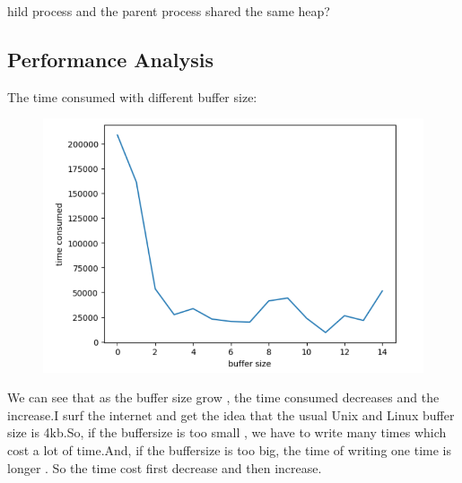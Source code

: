 \documentclass[]{article}
\begin{document}
\begin{enumerate}
                                                                                                                                                                                                                                                                                                                                                                                                                                                                                                                                                                                                                                                                                                                                                              hild process and the parent process shared the same heap?\par 
\end{enumerate}

\subsection*{Performance Analysis}
The time consumed with different buffer size:
\begin{figure}[H]
    \includegraphics[scale = 0.5]{2023-03-24-19-20-55.png}
\end{figure}
We can see that as the buffer size grow , the time consumed decreases and the increase.I surf the internet and get the idea that the usual Unix and Linux buffer size is 4kb.So, if the buffersize is too small , we have to write many times which cost a lot of time.And, if the buffersize is too big, the time of writing one time is longer . So the time cost first decrease and then increase.
\par 
\end{document}

